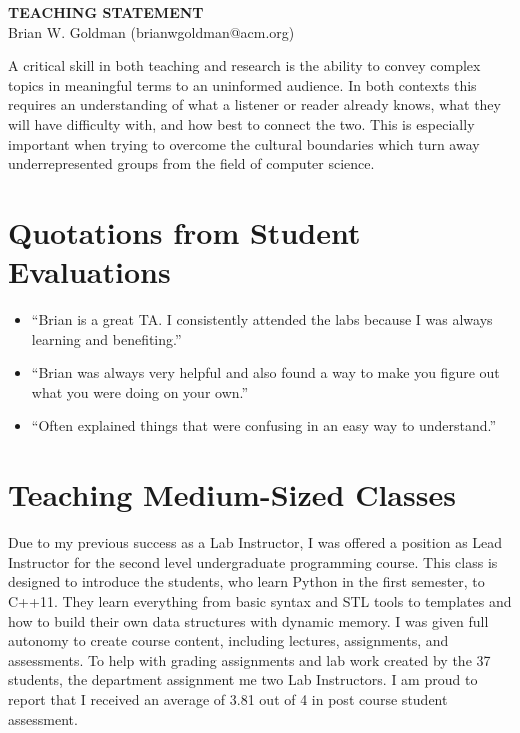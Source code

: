 \documentclass[a4paper, 11pt]{article}
\begin{document}
\thispagestyle{empty}

\pagestyle{fancy}

\begin{center}
{\LARGE \bf TEACHING STATEMENT}\\
\vspace*{0.1cm}
{\normalsize Brian W. Goldman (brianwgoldman@acm.org)}
\end{center}

\noindent
A critical skill in both teaching and research is the ability to convey
complex topics in meaningful terms to an uninformed audience. In both
contexts this requires an understanding of what a listener or reader
already knows, what they will have difficulty with, and how best to
connect the two. This is especially important when trying to overcome
the cultural boundaries which turn away underrepresented groups from
the field of computer science.

\section{Quotations from Student Evaluations}
\begin{itemize}
\item ``Brian is a great TA. I consistently attended the labs because I was always learning and benefiting.''
\item ``Brian was always very helpful and also found a way to make you figure out what you were doing on your own.''
\item ``Often explained things that were confusing in an easy way to understand.''
\end{itemize}

\section{Teaching Medium-Sized Classes}
Due to my previous success as a Lab Instructor, I was offered a
position as Lead Instructor for the second level undergraduate
programming course. This class is designed to introduce the students,
who learn Python in the first semester, to C++11. They learn
everything from basic syntax and STL tools to templates and how
to build their own data structures with dynamic memory.
I was given full autonomy to create course content, including
lectures, assignments, and assessments. To help with grading
assignments and lab work created by the 37 students, the
department assignment me two Lab Instructors.
I am proud to report that I received an average
of 3.81 out of 4 in post course student assessment.
\end{document}
